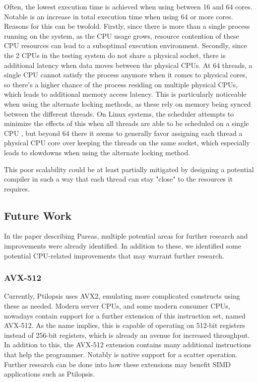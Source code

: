 \documentclass[11pt,dvipsnames]{article}
\begin{document}
Often, the lowest execution time is achieved when using between 16 and 64 cores. Notable is an increase in total execution time when using 64 or more cores. Reasons for this can be twofold. Firstly, since there is more than a single process running on the system, as the CPU usage grows, resource contention of these CPU resources can lead to a suboptimal execution environment. Secondly, since the 2 CPUs in the testing system do not share a physical socket, there is additional latency when data moves between the physical CPUs. At 64 threads, a single CPU cannot satisfy the process anymore when it comes to physical cores, so there's a higher chance of the process residing on multiple physical CPUs, which leads to additional memory access latency. This is particularly noticeable when using the alternate locking methods, as these rely on memory being synced between the different threads. On Linux systems, the scheduler attempts to minimize the effects of this when all threads are able to be scheduled on a single CPU \cite{kernelnuma}, but beyond 64 there it seems to generally favor assigning each thread a physical CPU core over keeping the threads on the same socket, which especially leads to slowdowns when using the alternate locking method.

This poor scalability could be at least partially mitigated by designing a potential compiler in such a way that each thread can stay "close" to the resources it requires.

\subsection{Future Work}
In the paper describing Pareas, multiple potential areas for further research and improvements were already identified. In addition to these, we identified some potential CPU-related improvements that may warrant further research.

\subsubsection*{AVX-512} \label{avx512}
Currently, Ptilopsis uses AVX2, emulating more complicated constructs using these as needed. Modern server CPUs, and some modern consumer CPUs, nowadays contain support for a further extension of this instruction set, named AVX-512. As the name implies, this is capable of operating on 512-bit registers instead of 256-bit registers, which is already an avenue for increased throughput. In addition to this, the AVX-512 extension contains many additional instructions that help the programmer. Notably is native support for a scatter operation. Further research can be done into how these extensions may benefit SIMD applications such as Ptilopsis.
\end{document}
